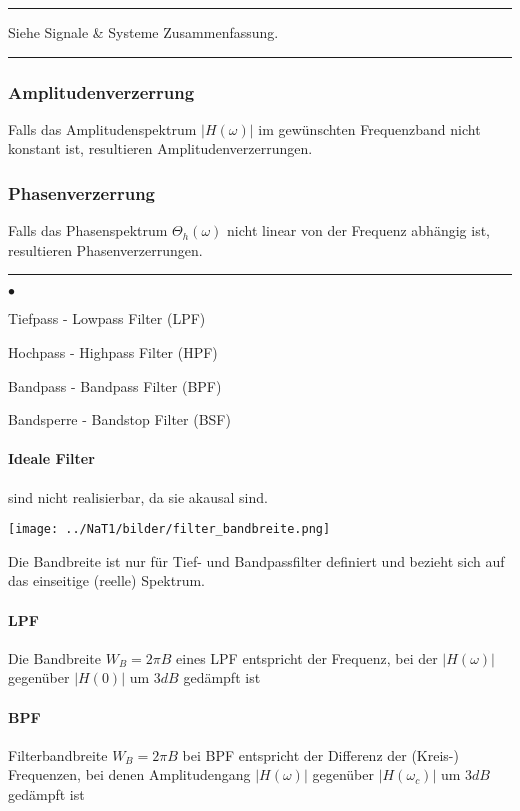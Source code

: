 \hrule
{}
Siehe Signale \& Systeme Zusammenfassung.\\

\hrule
{}
\subsubsection{Amplitudenverzerrung}
Falls das Amplitudenspektrum $|H(\omega)|$ im gewünschten Frequenzband nicht konstant ist,
resultieren Amplitudenverzerrungen.

\subsubsection{Phasenverzerrung}
Falls das Phasenspektrum $\Theta_h (\omega)$ nicht linear von der Frequenz abhängig ist, resultieren
Phasenverzerrungen.\\
\hrule
{}
\begin{list}{$\bullet$}{\setlength{\itemsep}{0cm} \setlength{\parsep}{0cm} \setlength{\topsep}{0cm}} 
  \item Tiefpass - Lowpass Filter (LPF)
  \item Hochpass - Highpass Filter (HPF)
  \item Bandpass - Bandpass Filter (BPF)
  \item Bandsperre - Bandstop Filter (BSF)
\end{list}
\paragraph{Ideale Filter} sind nicht realisierbar, da sie akausal sind.

\begin{minipage}{7cm}
	\texttt{[image: ../NaT1/bilder/filter\_bandbreite.png]}
\end{minipage}
\begin{minipage}{11cm}
	Die Bandbreite ist nur für Tief- und Bandpassfilter definiert und bezieht sich auf das einseitige (reelle) Spektrum.
	\paragraph{LPF}	Die Bandbreite $W_B = 2 \pi B$ eines LPF entspricht der Frequenz, bei der $|H(\omega)|$ gegenüber $|H(0)|$ um $3 dB$ gedämpft ist
	\paragraph{BPF}	Filterbandbreite $W_B = 2 \pi B$ bei BPF entspricht der Differenz der (Kreis-) Frequenzen, bei denen Amplitudengang $|H(\omega)|$ gegenüber $|H(\omega_c)|$ um
	$3 dB$ gedämpft ist
\end{minipage}


